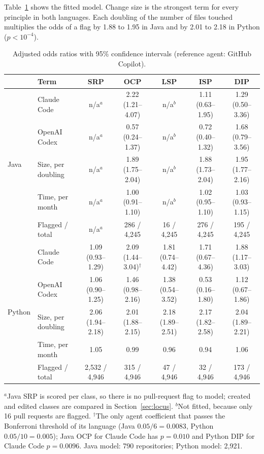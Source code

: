 \documentclass[sigconf]{acmart}
\begin{document}
Table~\ref{tab:model} shows the fitted model. Change size is the strongest term for every principle
in both languages. Each doubling of the number of files touched multiplies the odds of a flag by 1.88
to 1.95 in Java and by 2.01 to 2.18 in Python ($p < 10^{-4}$).

\begin{table}[t]
\caption{Adjusted odds ratios with 95\% confidence intervals (reference agent: GitHub Copilot).}
\label{tab:model}
\footnotesize
\begin{tabular}{@{}llccccc@{}}
\toprule
 & \textbf{Term} & \textbf{SRP} & \textbf{OCP} & \textbf{LSP} & \textbf{ISP} & \textbf{DIP} \\
\midrule
\multirow{5}{*}{Java}
 & Claude Code      & n/a$^a$ & 2.22 (1.21--4.07) & n/a$^b$ & 1.11 (0.63--1.95) & 1.29 (0.50--3.36) \\
 & OpenAI Codex     & n/a$^a$ & 0.57 (0.24--1.37) & n/a$^b$ & 0.72 (0.40--1.32) & 1.68 (0.79--3.56) \\
 & Size, per doubling & n/a$^a$ & 1.89 (1.75--2.04) & n/a$^b$ & 1.88 (1.73--2.04) & 1.95 (1.77--2.16) \\
 & Time, per month  & n/a$^a$ & 1.00 (0.91--1.10) & n/a$^b$ & 1.02 (0.95--1.10) & 1.03 (0.93--1.15) \\
 & Flagged / total  & n/a$^a$ & 286 / 4,245 & 16 / 4,245 & 276 / 4,245 & 195 / 4,245 \\
\midrule
\multirow{5}{*}{Python}
 & Claude Code      & 1.09 (0.93--1.29) & 2.09 (1.44--3.04)$^\dagger$ & 1.81 (0.74--4.42) & 1.71 (0.67--4.36) & 1.88 (1.17--3.03) \\
 & OpenAI Codex     & 1.06 (0.90--1.25) & 1.46 (0.98--2.16) & 1.38 (0.54--3.52) & 0.53 (0.16--1.80) & 1.12 (0.67--1.86) \\
 & Size, per doubling & 2.06 (1.94--2.18) & 2.01 (1.88--2.15) & 2.18 (1.89--2.51) & 2.17 (1.82--2.58) & 2.04 (1.89--2.21) \\
 & Time, per month  & 1.05 & 0.99 & 0.96 & 0.94 & 1.06 \\
 & Flagged / total  & 2,532 / 4,946 & 315 / 4,946 & 47 / 4,946 & 32 / 4,946 & 173 / 4,946 \\
\bottomrule
\end{tabular}

\vspace{3pt}
\raggedright\scriptsize $^a$Java SRP is scored per class, so there is no pull-request flag to model;
created and edited classes are compared in Section~\ref{sec:locus}. $^b$Not fitted, because only 16
pull requests are flagged. $^\dagger$The only agent coefficient that passes the Bonferroni threshold
of its language (Java $0.05/6 = 0.0083$, Python $0.05/10 = 0.005$); Java OCP for Claude Code has
$p = 0.010$ and Python DIP for Claude Code $p = 0.0096$. Java model: 790 repositories; Python model:
2,921.
\end{table}
\end{document}
